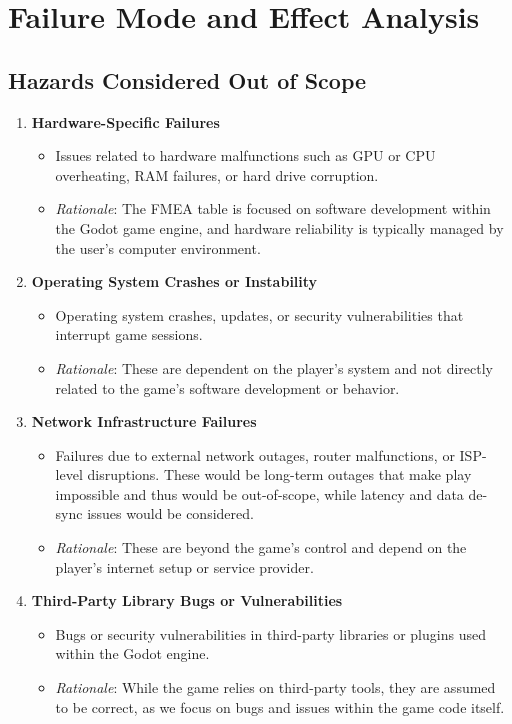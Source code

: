 \documentclass{article}
\begin{document}
\newpage
\section{Failure Mode and Effect Analysis}
\subsection{Hazards Considered Out of Scope}
\begin{enumerate}
    \item \textbf{Hardware-Specific Failures}
        \begin{itemize}
            \item Issues related to hardware malfunctions such as GPU or CPU overheating, RAM failures, or hard drive corruption.
            \item \textit{Rationale}: The FMEA table is focused on software development within the Godot game engine, and hardware reliability is typically managed by the user’s computer environment.
        \end{itemize}

    \item \textbf{Operating System Crashes or Instability}
        \begin{itemize}
            \item Operating system crashes, updates, or security vulnerabilities that interrupt game sessions.
            \item \textit{Rationale}: These are dependent on the player's system and not directly related to the game's software development or behavior.
        \end{itemize}

    \item \textbf{Network Infrastructure Failures}
        \begin{itemize}
            \item Failures due to external network outages, router malfunctions, or ISP-level disruptions. These would be long-term outages that make play impossible and thus would be out-of-scope, while latency and data de-sync issues would be considered.
            \item \textit{Rationale}: These are beyond the game's control and depend on the player's internet setup or service provider.
        \end{itemize}

    \item \textbf{Third-Party Library Bugs or Vulnerabilities}
        \begin{itemize}
            \item Bugs or security vulnerabilities in third-party libraries or plugins used within the Godot engine.
            \item \textit{Rationale}: While the game relies on third-party tools, they are assumed to be correct, as we focus on bugs and issues within the game code itself.
        \end{itemize}


\end{enumerate}
\end{document}
